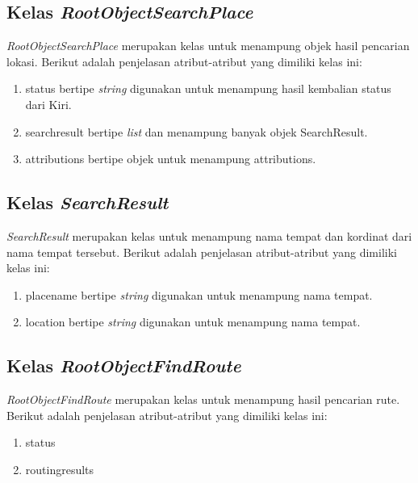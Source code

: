 \subsection{Kelas \textit{RootObjectSearchPlace}}
\label{lab:Kelas RootObjectSearchPlace}
\hspace{0.5cm} \textit{RootObjectSearchPlace} merupakan kelas untuk menampung objek hasil pencarian lokasi. Berikut adalah penjelasan atribut-atribut yang dimiliki kelas ini:
\begin{enumerate}
	\item status bertipe \textit{string} digunakan untuk menampung hasil kembalian status dari Kiri.
	\item searchresult bertipe \textit{list} dan menampung banyak objek SearchResult. 
	\item attributions bertipe objek untuk menampung attributions.
\end{enumerate}


\subsection{Kelas \textit{SearchResult}}
\label{lab:Kelas SearchResult}
\hspace{0.5cm} \textit{SearchResult} merupakan kelas untuk menampung nama tempat dan kordinat dari nama tempat tersebut. Berikut adalah penjelasan atribut-atribut yang dimiliki kelas ini:
\begin{enumerate}
	\item placename bertipe \textit{string} digunakan untuk menampung nama tempat. 
	\item location bertipe \textit{string} digunakan untuk menampung nama tempat.
\end{enumerate}

\subsection{Kelas \textit{RootObjectFindRoute}}
\label{lab:Kelas RootObjectFindRoute}
\hspace{0.5cm} \textit{RootObjectFindRoute} merupakan kelas untuk menampung hasil pencarian rute. Berikut adalah penjelasan atribut-atribut yang dimiliki kelas ini:
\begin{enumerate}
	\item status
	\item routingresults
\end{enumerate}

